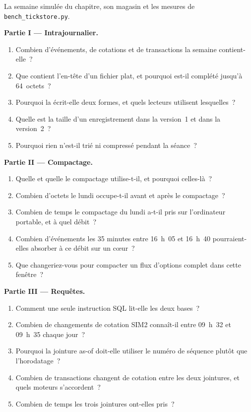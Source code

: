 \begin{problem}\label{pb:pl:a-tick-store-on-open-formats:1}
La semaine simulée du chapitre, son magasin et les mesures de \texttt{bench\_tickstore.py}.

\medskip\noindent\textbf{Partie I --- Intrajournalier.}
\begin{enumerate}
\item Combien d'événements, de cotations et de transactions la semaine contient-elle~?
\item Que contient l'en-tête d'un fichier plat, et pourquoi est-il complété jusqu'à 64~octets~?
\item Pourquoi la  écrit-elle deux formes, et quels lecteurs utilisent lesquelles~?
\item Quelle est la taille d'un enregistrement dans la version~1 et dans la version~2~?
\item Pourquoi rien n'est-il trié ni compressé pendant la séance~?
\end{enumerate}

\medskip\noindent\textbf{Partie II --- Compactage.}
\begin{enumerate}[resume]
\item Quelle  et quelle  le compactage utilise-t-il, et pourquoi celles-là~?
\item Combien d'octets le lundi occupe-t-il avant et après le compactage~?
\item Combien de temps le compactage du lundi a-t-il pris sur l'ordinateur portable, et à quel débit~?
\item Combien d'événements les 35 minutes entre 16~h~05 et 16~h~40 pourraient-elles absorber à ce débit sur un cœur~?
\item Que changeriez-vous pour compacter un flux d'options complet dans cette fenêtre~?
\end{enumerate}

\medskip\noindent\textbf{Partie III --- Requêtes.}
\begin{enumerate}[resume]
\item Comment une seule instruction SQL lit-elle les deux bases~?
\item Combien de changements de cotation SIM2 connaît-il entre 09~h~32 et 09~h~35 chaque jour~?
\item Pourquoi la jointure as-of doit-elle utiliser le numéro de séquence plutôt que l'horodatage~?
\item Combien de transactions changent de cotation entre les deux jointures, et quels moteurs s'accordent~?
\item Combien de temps les trois jointures ont-elles pris~?
\end{enumerate}


\end{problem}
